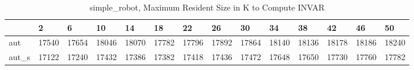 \begin{table}
\caption{simple_robot, Maximum Resident Size in K to Compute INVAR}
\label{simple_robot_INVAR_size}
\begin{tabular}{llllllllllllll}
\toprule
 & 2 & 6 & 10 & 14 & 18 & 22 & 26 & 30 & 34 & 38 & 42 & 46 & 50 \\
\midrule
aut & 17540 & 17654 & 18046 & 18070 & 17782 & 17796 & 17892 & 17864 & 18140 & 18136 & 18178 & 18186 & 18240 \\
aut_s & 17122 & 17240 & 17432 & 17386 & 17382 & 17418 & 17436 & 17472 & 17648 & 17650 & 17730 & 17760 & 17782 \\
\bottomrule
\end{tabular}
\end{table}
